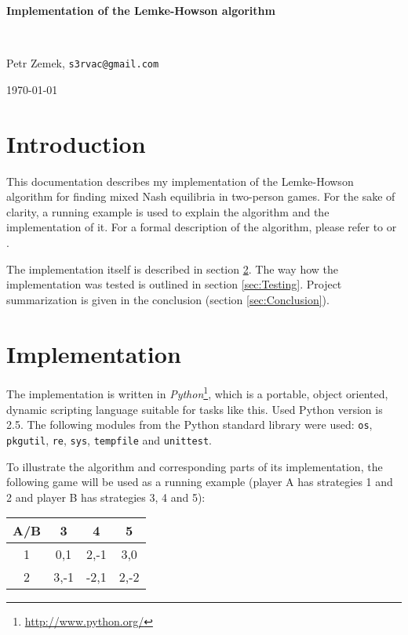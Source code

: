 \documentclass[a4paper,10pt]{article}
\begin{document}
\begin{center}
	\begin{Large}\textbf{Implementation of the Lemke-Howson
	algorithm}\end{Large} \\

	\vspace{0.4cm}

	Petr Zemek, \texttt{s3rvac@gmail.com}

	\vspace{0.4cm}

	\today
\end{center}

\section{Introduction}

This documentation describes my implementation of the Lemke-Howson algorithm
\cite{Lemke64} for finding mixed Nash equilibria in two-person games. For the
sake of clarity, a running example is used to explain the algorithm and the
implementation of it. For a formal description of the algorithm, please refer
to \cite{Lemke64} or \cite{Pritchard08}.

The implementation itself is described in section \ref{sec:Implementation}. The
way how the implementation was tested is outlined in section \ref{sec:Testing}.
Project summarization is given in the conclusion (section
\ref{sec:Conclusion}).

\section{Implementation}
\label{sec:Implementation}

The implementation is written in
\emph{Python}\footnote{\url{http://www.python.org/}}, which is a portable,
object oriented, dynamic scripting language suitable for tasks like this. Used
Python version is 2.5. The following modules from the Python standard library
were used: \texttt{os}, \texttt{pkgutil}, \texttt{re}, \texttt{sys},
\texttt{tempfile} and \texttt{unittest}.

To illustrate the algorithm and corresponding parts of its implementation, the
following game will be used as a running example (player A has strategies 1 and
2 and player B has strategies 3, 4 and 5):

\begin{center}
	\begin{tabular}{c||c|c|c}
		A/B & 3 & 4 & 5 \\
		\hline
		\hline
		1 & 0,1 & 2,-1 & 3,0 \\
		\hline
		2 & 3,-1 & -2,1 & 2,-2 \\
	\end{tabular}
\end{center}
\end{document}
